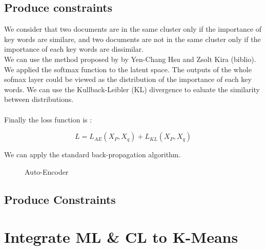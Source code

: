\documentclass{article}
\begin{document}
\subsection{Produce constraints}

We consider that two documents are in the same cluster only if the importance of
key words are similare, and two documents are not in the same cluster only if
the importance of each key words are dissimilar.
\\
We can use the method proposed by by Yen-Chang Hsu and Zsolt Kira (biblio). We
applied the softmax function to the latent space. The outputs of the whole
sofmax layer could be viewed as the distribution of the importance of each key
words. We can use the Kullback-Leibler (KL) divergence to ealuate the similarity
between distributions. 
\\ \\
Finally the loss function is :

\begin{equation}\label{eq:loss_FINALE}
  L = L_{AE}(X_P, X_q) + L_{KL}(X_P, X_q)
\end{equation}

We can apply the standard back-propagation algorithm.

\begin{figure}[!t]
  \centering
  
  \caption{Auto-Encoder}
  \label{fig:archi}
\end{figure}

\subsection{Produce Constraints}

\section{Integrate ML \& CL to K-Means}

%
%
\end{document}

